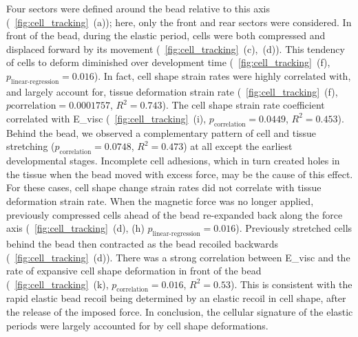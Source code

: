 Four sectors were defined around the bead relative to this axis (\figurename~\ref{fig:cell_tracking}~(a)); here, only the front and rear sectors were considered.
In front of the bead, during the elastic period, cells were both compressed and displaced forward by its movement (\figurename~\ref{fig:cell_tracking}~(c),~(d)).
This tendency of cells to deform diminished over development time (\figurename~\ref{fig:cell_tracking}~(f), \(p_\text{linear-regression} = 0.016\)). %
In fact, cell shape strain rates were highly correlated with, and largely account for, tissue deformation strain rate (\figurename~\ref{fig:cell_tracking}~(f),	\(p\text{correlation} = 0.0001757\), \(R^2 = 0.743\)).
The cell shape strain rate coefficient correlated with \gls{E_visc} (\figurename~\ref{fig:cell_tracking}~(i), \(p_\text{correlation} = 0.0449\), \(R^2 = 0.453\)).
Behind the bead, we observed a complementary pattern of cell and tissue stretching (\(p_\text{correlation} = 0.0748\), \(R^2 = 0.473\)) at all except the earliest developmental stages.
Incomplete cell adhesions, which in turn created holes in the tissue when the bead moved with excess force, may be the cause of this effect.
For these cases, cell shape change strain rates did not correlate with tissue deformation strain rate.
When the magnetic force was no longer applied, previously compressed cells ahead of the bead re-expanded back along the force axis (\figurename~\ref{fig:cell_tracking}~(d), (h) \(p_\text{linear-regression} = 0.016\)). %
Previously stretched cells behind the bead then contracted as the bead recoiled backwards (\figurename~\ref{fig:cell_tracking}~(d)).
There was a strong correlation between \gls{E_visc} and the rate of expansive cell shape deformation in front of the bead (\figurename~\ref{fig:cell_tracking}~(k), \(p_\text{correlation} = 0.016\), \(R^2 = 0.53\)).
This is consistent with the rapid elastic bead recoil being determined by an elastic recoil in cell shape, after the release of the imposed force.
In conclusion, the cellular signature of the elastic periods were largely accounted for by cell shape deformations.

